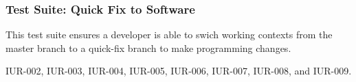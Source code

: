 \subsubsection{Test Suite: Quick Fix to Software}
\begin{description}[align=right,leftmargin=3.2cm,labelindent=3.0cm]
\item[Purpose:] This test suite ensures a developer is able to swich working contexts from  the master branch to a quick-fix branch to make programming changes.
\item[Requirement:] IUR-002, IUR-003, IUR-004, IUR-005, IUR-006, IUR-007, IUR-008, and IUR-009.
\end{description}
